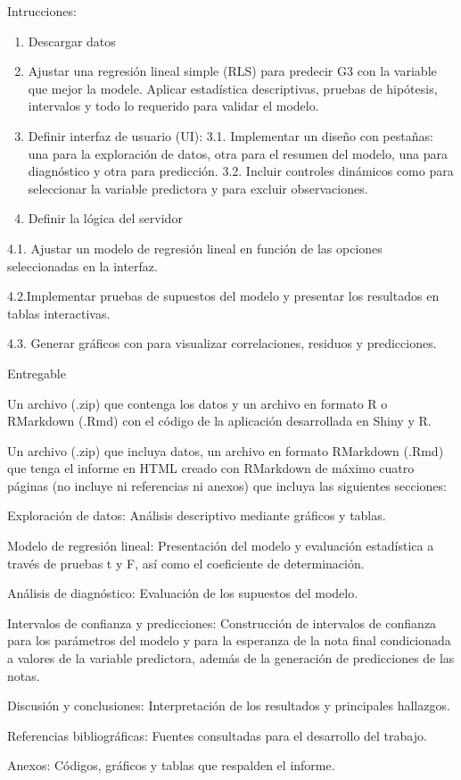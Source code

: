 \documentclass[
]{article}
\begin{document}
Intrucciones:

\begin{enumerate}
\def\labelenumi{\arabic{enumi}.}
\item
  Descargar datos
\item
  Ajustar una regresión lineal simple (RLS) para predecir G3 con la
  variable que mejor la modele. Aplicar estadística descriptivas,
  pruebas de hipótesis, intervalos y todo lo requerido para validar el
  modelo.
\item
  Definir interfaz de usuario (UI): 3.1. Implementar un diseño con
  pestañas: una para la exploración de datos, otra para el resumen del
  modelo, una para diagnóstico y otra para predicción. 3.2. Incluir
  controles dinámicos como para seleccionar la variable predictora y
  para excluir observaciones.
\item
  Definir la lógica del servidor
\end{enumerate}

4.1. Ajustar un modelo de regresión lineal en función de las opciones
seleccionadas en la interfaz.

4.2.Implementar pruebas de supuestos del modelo y presentar los
resultados en tablas interactivas.

4.3. Generar gráficos con para visualizar correlaciones, residuos y
predicciones.

Entregable

Un archivo (.zip) que contenga los datos y un archivo en formato R o
RMarkdown (.Rmd) con el código de la aplicación desarrollada en Shiny y
R.

Un archivo (.zip) que incluya datos, un archivo en formato RMarkdown
(.Rmd) que tenga el informe en HTML creado con RMarkdown de máximo
cuatro páginas (no incluye ni referencias ni anexos) que incluya las
siguientes secciones:

Exploración de datos: Análisis descriptivo mediante gráficos y tablas.

Modelo de regresión lineal: Presentación del modelo y evaluación
estadística a través de pruebas t y F, así como el coeficiente de
determinación.

Análisis de diagnóstico: Evaluación de los supuestos del modelo.

Intervalos de confianza y predicciones: Construcción de intervalos de
confianza para los parámetros del modelo y para la esperanza de la nota
final condicionada a valores de la variable predictora, además de la
generación de predicciones de las notas.

Discusión y conclusiones: Interpretación de los resultados y principales
hallazgos.

Referencias bibliográficas: Fuentes consultadas para el desarrollo del
trabajo.

Anexos: Códigos, gráficos y tablas que respalden el informe.
\end{document}
